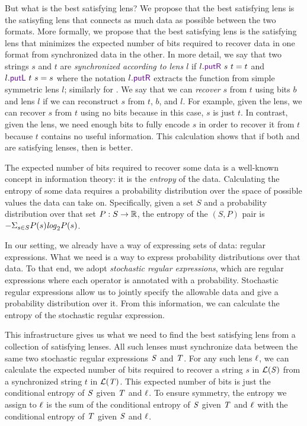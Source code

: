 \documentclass[acmsmall,screen,anonymous]{acmart}
\begin{document}
But what is the best satisfying lens? We propose that the
best satisfying lens is the satisyfing lens that connects as much data
as possible between the two formats. More formally, we
propose that the best satisfying lens is the satisfying lens that 
minimizes the expected number of bits required to recover data in
one format from synchronized data in the other.  
In more detail, we say that two strings $s$ and $t$
are \emph{synchronized according to lens $l$} if 
$l.\PutR\ s\ t = t$ and $l.\PutL\ t\ s = s$ where the notation $l.\PutR$
extracts the \PutR function from simple symmetric lens $l$; similarly
for \PutL.
We say that we can \emph{recover} $s$ from $t$ using bits $b$ and lens
$l$ if we can reconstruct $s$ from $t$, $b$, and $l$.  For example,
given the \IdentityLens{} lens, we can recover $s$ from $t$ using
no bits because in this case, $s$ is just $t$.  In contrast, given
the \Disconnect{} lens, we need enough bits to fully encode $s$ in
order to recover it from $t$ because $t$ contains no useful
information.  This calculation shows that if both \IdentityLens{}
and \Disconnect{} are satisfying lenses, then \IdentityLens{} is
better. 

The expected number of bits required to recover some data is a
well-known concept in information theory: it is the \emph{entropy} of
the data. Calculating the 
entropy of some data requires a probability distribution over the
space of possible values the data can take on.  Specifically,
given a set $S$ and a probability distribution over that set $P
: S \rightarrow \mathbb{R}$, the entropy of the $(S,P)$ pair is $-\Sigma_{s\in
  S}P(s)\mathit{log}_2P(s)$. 

In our setting, we already have a way of expressing sets of data:
regular expressions.  What we need is a way to express probability
distributions over that data.
To that end, we adopt \emph{stochastic regular expressions}, 
which are regular expressions where each operator is annotated with a
probability.  Stochastic regular expressions
allow us to jointly specify the allowable data and give a probability
distribution over it.  From this information, we can calculate the
entropy of the stochastic regular expression. 

This infrastructure gives us what we need to find the best
satisfying lens from a collection of satisfying lenses.  All such
lenses must synchronize data between the same two 
stochastic regular expressions $\mathit{S}$ and $\mathit{T}$.
For any such lens $\mathit{\ell}$, we can calculate the expected number of
bits required 
to recover a string $s$ in $\mathcal{L}(\mathit{S})$ from a synchronized
string $t$ in $\mathcal{L}(\mathit{T})$. 
This expected number of bits is just the conditional entropy of
$\mathit{S}$ given $\mathit{T}$ and $\mathit{\ell}$. 
To ensure symmetry, the entropy we assign to $\mathit{\ell}$ is the sum of 
the conditional entropy of $\mathit{S}$ given $\mathit{T}$ and $\mathit{\ell}$ with 
the conditional entropy of $\mathit{T}$ given $\mathit{S}$ and $\mathit{\ell}$.
\end{document}
